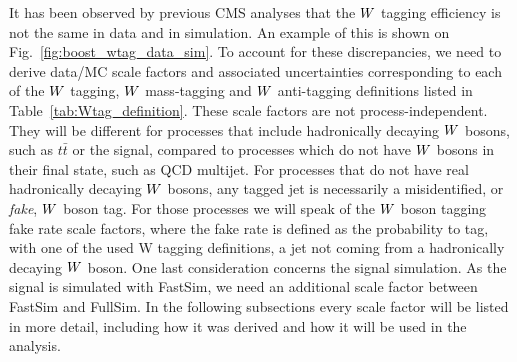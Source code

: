 It has been observed by previous CMS analyses that the $W$ tagging efficiency is not the same in
data and in simulation. An example of this is shown on Fig.~\ref{fig:boost_wtag_data_sim}. 
To account for these discrepancies, we need to derive data/MC scale factors and associated
uncertainties corresponding to each of the $W$ tagging, $W$ mass-tagging and $W$ anti-tagging
definitions listed in Table~\ref{tab:Wtag_definition}. These scale factors are not
process-independent. They will be different for processes that include hadronically decaying $W$
bosons, such as $t\bar{t}$ or the signal, compared to processes which do not have $W$ bosons in
their final state, such as QCD multijet. For processes that do not have real hadronically decaying
$W$ bosons, any tagged jet is necessarily a misidentified, or \textit{fake}, $W$ boson tag. For
those processes we will speak of the $W$ boson tagging fake rate scale factors, where the fake rate
is defined as the probability to tag, with one of the used W tagging definitions, a jet not coming
from a hadronically decaying $W$ boson. 
One last consideration concerns the signal simulation. As the signal is simulated with FastSim, we
need an additional scale factor between FastSim and FullSim. 
In the following subsections every scale factor will be listed in more detail, including how it was
derived and how it will be used in the analysis. 

